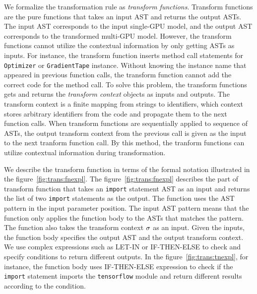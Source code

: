 We formalize the transformation rule as \textit{transform functions}.
Transform functions are the pure functions that takes an input AST and
returns the output ASTs.
The input AST corresponds to the input single-GPU model,
and the output AST corresponds to the transformed multi-GPU model.
However, the transform functions cannot utilize the contextual information
by only getting ASTs as inputs.
For instance, the transform function inserts method call statements for
{\tt Optimizer} or {\tt GradientTape} instance.
Without knowing the instance name that appeared in previous function calls,
the transform function cannot add the correct code for the method call.
To solve this problem, the transform functions gets and returns
the \textit{transform context} objects as inputs and outputs.
The transform context is a finite mapping from strings to identifiers, which
context stores arbitrary identifiers from the code and propagate them to the 
next function calls.
When transform functions are sequentially applied to sequence of ASTs, 
the output transform context from the previous call is given as the input
to the next tranform function call.
By this method, the tranform functions can utilize contextual information
during transformation.

We describe the transform function in terms of the formal notation illustrated
in the figure~\ref{fig:trans:fnexpl}.
The figure~\ref{fig:trans:fnexpl} describes the part of transform function that
takes an {\tt import} statement AST as an input and returns the list of 
two {\tt import} statements as the output.
The function uses the AST pattern in the input parameter position.
The input AST pattern means that the function only applies the function body
to the ASTs that matches the pattern. 
The function also takes the transform context $\sigma$ as an input.
Given the inputs, the function body specifies the output AST and the output
transform context.
We use complex expressions such as LET-IN or IF-THEN-ELSE to 
check and specify conditions to return different outputs.
In the figure~\ref{fig:trans:tnexpl}, for instance, 
the function body uses IF-THEN-ELSE expression to check if the {\tt import}
statement imports the {\tt tensorflow} module and return different
results according to the condition.

